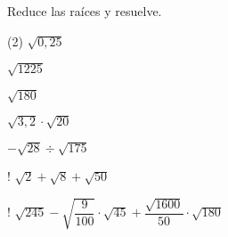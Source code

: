 \documentclass[]{srs}
\begin{document}
Reduce las raíces y resuelve.
\begin{preguntas}(2)
  \pregunta $\sqrt{0,25}$
  \begin{malla}[height=5cm]
  \end{malla}
  \pregunta $\sqrt{1225}$
  \begin{malla}[height=5cm]
  \end{malla}
  \pregunta $\sqrt{180}$
  \begin{malla}[height=5cm]
  \end{malla}
  \pregunta $\sqrt{3,2}\cdot\sqrt{20}$
  \begin{malla}[height=5cm]
  \end{malla}
  \pregunta $-\sqrt{28}\div\sqrt{175}$
  \begin{malla}[height=5cm]
  \end{malla}
  \pregunta! $\sqrt{2}+\sqrt{8}+\sqrt{50}$
  \begin{malla}[height=5cm]
  \end{malla}
  \pregunta! $\sqrt{245}-\sqrt{\dfrac{9}{100}}\cdot\sqrt{45}+\dfrac{\sqrt{1600}}{50}\cdot\sqrt{180}$
  \begin{malla}[height=7cm]
  \end{malla}
\end{preguntas}
\end{document}
